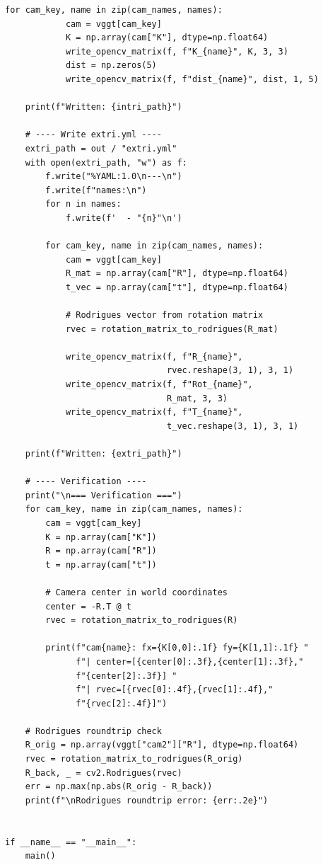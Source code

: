 \documentclass[11pt, a4paper]{report}
\begin{document}
\begin{lstlisting}[caption={vggt\_to\_easymocap.py --- VGGT 결과를 EasyMocap intri.yml/extri.yml로 변환}, label=lst:converter]
        for cam_key, name in zip(cam_names, names):
            cam = vggt[cam_key]
            K = np.array(cam["K"], dtype=np.float64)
            write_opencv_matrix(f, f"K_{name}", K, 3, 3)
            dist = np.zeros(5)
            write_opencv_matrix(f, f"dist_{name}", dist, 1, 5)

    print(f"Written: {intri_path}")

    # ---- Write extri.yml ----
    extri_path = out / "extri.yml"
    with open(extri_path, "w") as f:
        f.write("%YAML:1.0\n---\n")
        f.write(f"names:\n")
        for n in names:
            f.write(f'  - "{n}"\n')

        for cam_key, name in zip(cam_names, names):
            cam = vggt[cam_key]
            R_mat = np.array(cam["R"], dtype=np.float64)
            t_vec = np.array(cam["t"], dtype=np.float64)

            # Rodrigues vector from rotation matrix
            rvec = rotation_matrix_to_rodrigues(R_mat)

            write_opencv_matrix(f, f"R_{name}",
                                rvec.reshape(3, 1), 3, 1)
            write_opencv_matrix(f, f"Rot_{name}",
                                R_mat, 3, 3)
            write_opencv_matrix(f, f"T_{name}",
                                t_vec.reshape(3, 1), 3, 1)

    print(f"Written: {extri_path}")

    # ---- Verification ----
    print("\n=== Verification ===")
    for cam_key, name in zip(cam_names, names):
        cam = vggt[cam_key]
        K = np.array(cam["K"])
        R = np.array(cam["R"])
        t = np.array(cam["t"])

        # Camera center in world coordinates
        center = -R.T @ t
        rvec = rotation_matrix_to_rodrigues(R)

        print(f"cam{name}: fx={K[0,0]:.1f} fy={K[1,1]:.1f} "
              f"| center=[{center[0]:.3f},{center[1]:.3f},"
              f"{center[2]:.3f}] "
              f"| rvec=[{rvec[0]:.4f},{rvec[1]:.4f},"
              f"{rvec[2]:.4f}]")

    # Rodrigues roundtrip check
    R_orig = np.array(vggt["cam2"]["R"], dtype=np.float64)
    rvec = rotation_matrix_to_rodrigues(R_orig)
    R_back, _ = cv2.Rodrigues(rvec)
    err = np.max(np.abs(R_orig - R_back))
    print(f"\nRodrigues roundtrip error: {err:.2e}")


if __name__ == "__main__":
    main()
\end{lstlisting}
\end{document}
